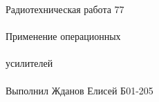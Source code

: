 \documentclass{astroedu-lab}
\begin{document}
\begin{problem}{\huge Радиотехническая работа 77\\\\Применение операционных\\\\усилителей\\\\Выполнил Жданов Елисей Б01-205}
%
%
%
%
%


\end{problem}
\end{document}
